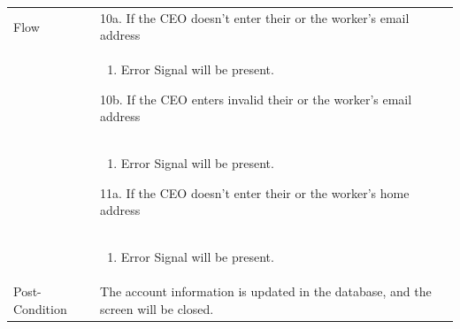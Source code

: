 \documentclass[12pt,a4paper]{report}
\begin{document}
\begin{tabular}{ | m{3cm} | m{12cm}| } \hline
Flow &
10a. If the CEO doesn't enter their or the worker's email address\\ 	
&	\begin{enumerate}
		\item Error Signal will be present.
	\end{enumerate}
10b. If the CEO enters invalid their or the worker's email address\\ 	
&	\begin{enumerate}
		\item Error Signal will be present.
	\end{enumerate}
11a. If the CEO doesn't enter their or the worker's home address\\ 	
&	\begin{enumerate}
		\item Error Signal will be present.
	\end{enumerate}
\\ \hline
Post-Condition &  The account information is updated in the database, and the screen will be closed. \\\hline
\end{tabular}
\end{document}
